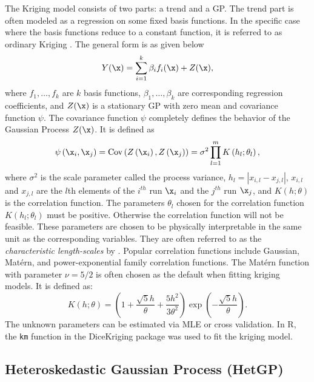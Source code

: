 \documentclass [PhD] {package/uclathes}
\begin{document}
The Kriging model consists of two parts: a trend and a GP. The trend part is often modeled as a regression on some fixed basis functions. In the specific case where the basis functions reduce to a constant function, it is referred to as ordinary Kriging  \parencite{roustant2012dicekriging}. The general form is as given below
\begin{equation}\label{eq:UK}
      Y(\x) = \sum_{i=1}^k \beta_i f_i(\x) + Z(\x),
\end{equation}
where $f_1, \ldots, f_k$ are $k$ basis functions, $\beta_1, \dots,\beta_k$ are corresponding regression coefficients, and  \(Z(\x)\) is a stationary GP with zero mean and covariance function \(\psi\). %
The covariance function $\psi$ completely defines the behavior of the Gaussian Process $Z(\x)$. It is defined as
\begin{equation}
\psi\left(\x_{i},\x_{j}\right) =\operatorname{Cov} \left(Z\left(\x_{i}\right), Z\left(\x_{j}\right)\right) = \sigma^{2} \prod_{l=1}^{m} K\left(h_{l} ; \theta_{l}\right),
\end{equation}
where $\sigma^2$ is the scale parameter called the process variance,
$h_l = |x_{i,l}-x_{j,l}|$, $x_{i,l}$ and $x_{j,l}$ are the $l$th elements of the $i^{th}$ run $\x_i$ and the $j^{th}$ run $\x_j$, and $K(h ; \theta)$ is the correlation function.
The parameters $\theta_l$ chosen for the correlation function $K\left(h_{l};\theta_{l}\right)$  must be positive. Otherwise the correlation function will not be feasible. These parameters are chosen to be physically interpretable in the same unit as the corresponding variables. They are often referred to as the \textit{characteristic length-scales} by \textcite{rasmussen2006gaussian}. Popular correlation functions include Gaussian, Mat\'ern, and power-exponential family correlation functions. The Mat\'ern function with parameter $\nu = 5/2$ is often chosen as the default when fitting kriging models. It is defined as:
\begin{equation}
K(h ; \theta)=\left(1+\frac{\sqrt{5} h}{\theta}+\frac{5 h^{2}}{3 \theta^{2}}\right) \exp \left(-\frac{\sqrt{5} h}{\theta}\right).
\end{equation}
The unknown parameters can be estimated via MLE or cross validation. In R, the \texttt{km} function  in the DiceKriging package was used to fit the kriging model.


\subsection*{{Heteroskedastic Gaussian Process (HetGP)}}
\end{document}
